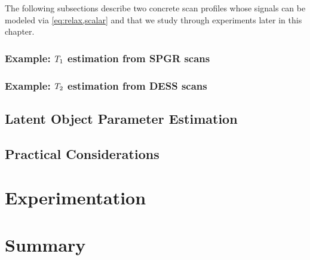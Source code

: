 The following subsections
describe two concrete scan profiles
whose signals can be modeled 
via \eqref{eq:relax,scalar} 
and that we study through experiments
later in this chapter.

\subsubsection{Example: $T_1$ estimation from SPGR scans}
\label{eq:relax,meth,sig,t1}

\subsubsection{Example: $T_2$ estimation from DESS scans}
\label{eq:relax,meth,sig,t2}

\subsection{Latent Object Parameter Estimation}
\label{ss,relax,meth,est}

\subsection{Practical Considerations}
\label{ss,relax,meth,pract}

\section{Experimentation}
\label{s,relax,exp}

\section{Summary}
\label{s,relax,summ}
